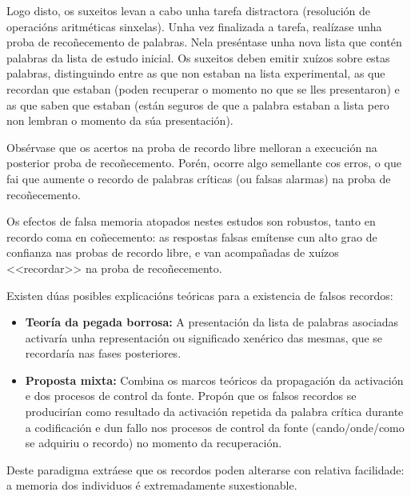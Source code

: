 \documentclass[a4paper,11pt]{article}
\begin{document}
Logo disto, os suxeitos levan a cabo unha tarefa distractora (resolución de operacións aritméticas sinxelas). Unha vez finalizada a tarefa, realízase unha proba de recoñecemento de palabras. Nela preséntase unha nova lista que contén palabras da lista de estudo inicial. Os suxeitos deben emitir xuízos sobre estas palabras, distinguindo entre as que non estaban na lista experimental, as que recordan que estaban (poden recuperar o momento no que se lles presentaron) e as que saben que estaban (están seguros de que a palabra estaban a lista pero non lembran o momento da súa presentación).

Obsérvase que os acertos na proba de recordo libre melloran a execución na posterior proba de recoñecemento. Porén, ocorre algo semellante cos erros, o que fai que aumente o recordo de palabras críticas (ou falsas alarmas) na proba de recoñecemento. 

Os efectos de falsa memoria atopados nestes estudos son robustos, tanto en recordo coma en coñecemento: as respostas falsas emítense cun alto grao de confianza nas probas de recordo libre, e van acompañadas de xuízos <<recordar>> na proba de recoñecemento. 

Existen dúas posibles explicacións teóricas para a existencia de falsos recordos:
\begin{itemize}
	\item \textbf{Teoría da pegada borrosa:} A presentación da lista de palabras asociadas activaría
	unha representación ou significado xenérico das mesmas, que se recordaría nas fases posteriores.
	\item \textbf{Proposta mixta:} Combina os marcos teóricos da propagación da activación e dos
	procesos de control da fonte. Propón que os falsos recordos se producirían como resultado da 
	activación repetida da palabra crítica durante a codificación e dun fallo nos procesos de 
	control da fonte (cando/onde/como se adquiriu o recordo) no momento da recuperación.
\end{itemize}

Deste paradigma extráese que os recordos poden alterarse con relativa facilidade: a memoria dos individuos é extremadamente suxestionable.
\end{document}
